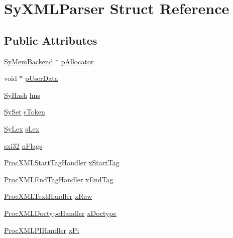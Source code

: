 \hypertarget{struct_sy_x_m_l_parser}{\section{Sy\-X\-M\-L\-Parser Struct Reference}
\label{df/d7b/struct_sy_x_m_l_parser}
}
\subsection*{Public Attributes}
\begin{DoxyCompactItemize}
\item 
\hyperlink{struct_sy_mem_backend}{Sy\-Mem\-Backend} $\ast$ \hyperlink{struct_sy_x_m_l_parser_a7be292fd52779aa60fd570079317e906}{p\-Allocator}
\item 
void $\ast$ \hyperlink{struct_sy_x_m_l_parser_a9ab0006874f3bc250ce2f62fd603ca48}{p\-User\-Data}
\item 
\hyperlink{struct_sy_hash}{Sy\-Hash} \hyperlink{struct_sy_x_m_l_parser_af6acad925a719fcd1a6e7eeafe10c803}{hns}
\item 
\hyperlink{struct_sy_set}{Sy\-Set} \hyperlink{struct_sy_x_m_l_parser_afc89c44dae666010648b27383f07551b}{s\-Token}
\item 
\hyperlink{struct_sy_lex}{Sy\-Lex} \hyperlink{struct_sy_x_m_l_parser_a444deb49a5a653787ce580e545caf792}{s\-Lex}
\item 
\hyperlink{unqlite_8c_a5a58035d4ae379178e2ca46cc3272fc5}{sxi32} \hyperlink{struct_sy_x_m_l_parser_aa000452d8e470d1c113ac9a0885b7bda}{n\-Flags}
\item 
\hyperlink{unqlite_8c_a0e7b47257fa2c220692c888aa5b97e20}{Proc\-X\-M\-L\-Start\-Tag\-Handler} \hyperlink{struct_sy_x_m_l_parser_ae2a2551a577ac075482d746023504212}{x\-Start\-Tag}
\item 
\hyperlink{unqlite_8c_a0905e9dd5648854c7866d3616e77bb3f}{Proc\-X\-M\-L\-End\-Tag\-Handler} \hyperlink{struct_sy_x_m_l_parser_a262ec8859e4f7e9caa67a4e049683a84}{x\-End\-Tag}
\item 
\hyperlink{unqlite_8c_ad06f20ecec52b0a3c0dd6018b5cb85ff}{Proc\-X\-M\-L\-Text\-Handler} \hyperlink{struct_sy_x_m_l_parser_a5a0bc37681246364aa9de0e34baf4f7f}{x\-Raw}
\item 
\hyperlink{unqlite_8c_ac231e062e45772b60f66fed2631cea4e}{Proc\-X\-M\-L\-Doctype\-Handler} \hyperlink{struct_sy_x_m_l_parser_ae58edd222e2d91132122bd3bd7d36fae}{x\-Doctype}
\item 
\hyperlink{unqlite_8c_a2cfa40471da66c7332e7950abe101a9a}{Proc\-X\-M\-L\-P\-I\-Handler} \hyperlink{struct_sy_x_m_l_parser_a1824faa7e00e79e5b3c43ccb1c60f155}{x\-Pi}

\end{DoxyCompactItemize}
